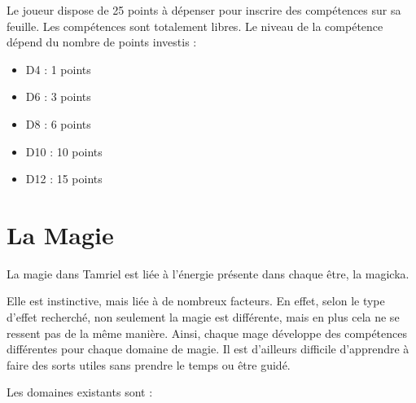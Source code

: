 Le joueur dispose de 25 points à dépenser pour inscrire des compétences sur sa feuille. Les compétences sont totalement libres. Le niveau de la compétence dépend du nombre de points investis :

\begin{itemize}
\item D4 : 1 points
\item D6 : 3 points
\item D8 : 6 points
\item D10 : 10 points
\item D12 : 15 points
\end{itemize}


\section{La Magie}

La magie dans Tamriel est liée à l'énergie présente dans chaque être, la magicka.

Elle est instinctive, mais liée à de nombreux facteurs. En effet, selon le type d'effet recherché, non seulement la magie est différente, mais en plus cela ne se ressent pas de la même manière. Ainsi, chaque mage développe des compétences différentes pour chaque domaine de magie. Il est d'ailleurs difficile d'apprendre à faire des sorts utiles sans prendre le temps ou être guidé.

Les domaines existants sont :

